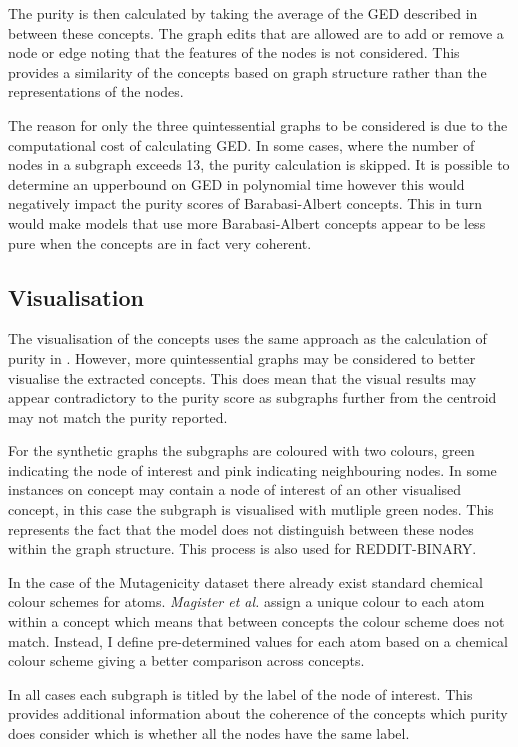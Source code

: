 The purity is then calculated by taking the average of the GED described in  between these concepts.
The graph edits that are allowed are to add or remove a node or edge noting that the features of the nodes is not considered.
This provides a similarity of the concepts based on graph structure rather than the representations of the nodes.

The reason for only the three quintessential graphs to be considered is due to the computational cost of calculating GED.
In some cases, where the number of nodes in a subgraph exceeds 13, the purity calculation is skipped.
It is possible to determine an upperbound on GED in polynomial time however this would negatively impact the purity scores of Barabasi-Albert concepts.
This in turn would make models that use more Barabasi-Albert concepts appear to be less pure when the concepts are in fact very coherent.

\subsection{Visualisation}
\label{sec:vis}
The visualisation of the concepts uses the same approach as the calculation of purity in .
However, more quintessential graphs may be considered to better visualise the extracted concepts.
This does mean that the visual results may appear contradictory to the purity score as subgraphs further from the centroid may not match the purity reported.

For the synthetic graphs the subgraphs are coloured with two colours, green indicating the node of interest and pink indicating neighbouring nodes.
In some instances on concept may contain a node of interest of an other visualised concept, in this case the subgraph is visualised with mutliple green nodes.
This represents the fact that the model does not distinguish between these nodes within the graph structure.
This process is also used for REDDIT-BINARY\cite{Morris+2020}.

In the case of the Mutagenicity\cite{Morris+2020} dataset there already exist standard chemical colour schemes for atoms.
\textit{Magister et al.}\cite{magister2021gcexplainer} assign a unique colour to each atom within a concept which means that between concepts the colour scheme does not match.
Instead, I define pre-determined values for each atom based on a chemical colour scheme giving a better comparison across concepts.

In all cases each subgraph is titled by the label of the node of interest.
This provides additional information about the coherence of the concepts which purity does consider which is whether all the nodes have the same label.

